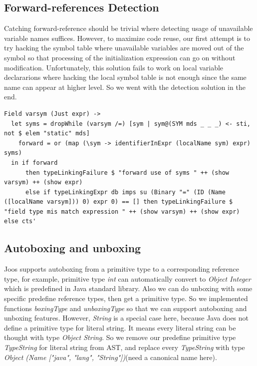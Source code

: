 \documentclass[12pt,letterpaper]{article}
\begin{document}
\subsection{Forward-references Detection}
Catching forward-reference should be trivial where detecting usage of unavailable variable names suffices. However, to maximize code reuse, our first attempt is to try hacking the symbol table where unavailable variables are moved out of the symbol so that processing of the initialization expression can go on without modification. Unfortunately, this solution fails to work on local variable declararions where hacking the local symbol table is not enough since the same name can appear at higher level. So we went with the detection solution in the end.
\begin{lstlisting}
Field varsym (Just expr) ->
  let syms = dropWhile (varsym /=) [sym | sym@(SYM mds _ _ _) <- sti, not $ elem "static" mds]
    forward = or (map (\sym -> identifierInExpr (localName sym) expr) syms)
  in if forward
      then typeLinkingFailure $ "forward use of syms " ++ (show varsym) ++ (show expr)
      else if typeLinkingExpr db imps su (Binary "=" (ID (Name ([localName varsym])) 0) expr 0) == [] then typeLinkingFailure $ "field type mis match expression " ++ (show varsym) ++ (show expr) else cts'
\end{lstlisting}

\subsection{Autoboxing and unboxing}

Joos supports autoboxing from a primitive type to a corresponding reference type, for example, primitive type \emph{int} can automatically convert to \emph{Object Integer} which is predefined in Java standard library.
Also we can do unboxing with some specific predefine reference types, then get a primitive type.
So we implemented functions \emph{boxingType} and \emph{unboxingType} so that we can support autoboxing and unboxing features.
However, \emph{String} is a special case here, because Java does not define a primitive type for literal string.
It means every literal string can be thought with type \emph{Object String}.
So we remove our predefine primitive type \emph{TypeString} for literal string from AST, and replace every \emph{TypeString} with type \emph{Object (Name ["java", "lang", "String"])}(need a canonical name here).
\end{document}
